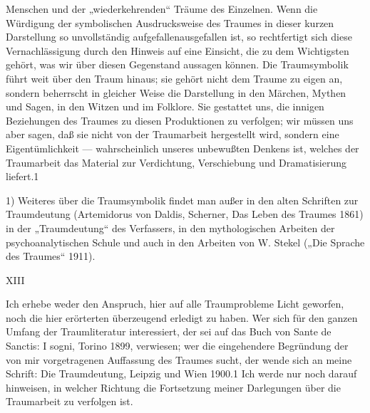 \documentclass{article}
\begin{document}
         
            
            
            
        \pstart
        Menschen und der „wiederkehrenden“ Träume des Einzelnen. Wenn die
               Würdigung der symbolischen Ausdrucksweise des Traumes in dieser kurzen
               Darstellung so unvollständig aufgefallenausgefallen ist, so rechtfertigt sich diese
               Vernachlässigung durch den Hinweis auf eine Einsicht, die zu dem
               Wichtigsten gehört, was wir über diesen Gegenstand aussagen können. Die
               Traumsymbolik führt weit über den Traum hinaus; sie gehört nicht dem Traume
               zu eigen an, sondern beherrscht in gleicher Weise die Darstellung in den
               Märchen, Mythen und Sagen, in den Witzen und im Folklore. Sie gestattet uns, die
               innigen Beziehungen des Traumes zu diesen Produktionen zu verfolgen; wir müssen
               uns aber sagen, daß sie nicht von der Traumarbeit hergestellt wird, sondern
               eine Eigentümlichkeit — wahrscheinlich unseres unbewußten Denkens
               ist, welches der Traumarbeit das Material zur Verdichtung, Verschiebung und
               Dramatisierung liefert.1
        \pend
    
            1) Weiteres über die
               Traumsymbolik findet man außer in den alten Schriften zur Traumdeutung (Artemidorus von Daldis, Scherner, Das Leben des
               Traumes 1861) in der „Traumdeutung“ des Verfassers, in den mythologischen
               Arbeiten der psychoanalytischen Schule und auch in den Arbeiten von W. Stekel („Die Sprache des Traumes“ 1911).
         
            
            
            
        \pstart
        XIII
        \pend
    
            
        \pstart
        Ich erhebe weder den Anspruch, hier auf alle Traumprobleme Licht geworfen, noch
               die hier erörterten überzeugend erledigt zu haben. Wer sich für den ganzen
               Umfang der Traumliteratur interessiert, der sei auf das Buch von Sante de Sanctis:
               I sogni, Torino 1899, verwiesen; wer die eingehendere
                  Begründung der von mir vorgetragenen Auffassung des Traumes
               sucht, der wende sich an meine Schrift: Die
                  Traumdeutung, Leipzig und Wien 1900.1 Ich werde nur noch darauf hinweisen, in welcher Richtung die
               Fortsetzung meiner Darlegungen über die Traumarbeit zu verfolgen ist.
        \pend
    
\end{document}

